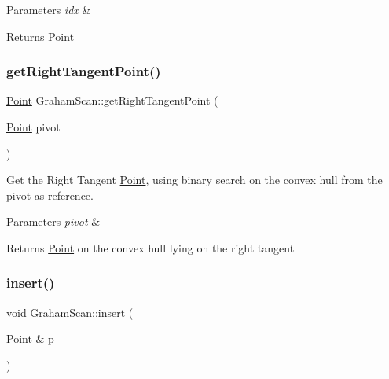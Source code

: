 \begin{DoxyParams}{Parameters}
{\em idx} & \\
\hline
\end{DoxyParams}
\begin{DoxyReturn}{Returns}
\mbox{\hyperlink{classPoint}{Point}} 
\end{DoxyReturn}
\mbox{\label{classGrahamScan_ae01e3fe104346f991f951a6843a15893}} 
\subsubsection{\texorpdfstring{get\+Right\+Tangent\+Point()}{getRightTangentPoint()}}
{\footnotesize\ttfamily \mbox{\hyperlink{classPoint}{Point}} Graham\+Scan\+::get\+Right\+Tangent\+Point (\begin{DoxyParamCaption}\item[{\mbox{\hyperlink{classPoint}{Point}}}]{pivot }\end{DoxyParamCaption})}



Get the Right Tangent \mbox{\hyperlink{classPoint}{Point}}, using binary search on the convex hull from the pivot as reference. 


\begin{DoxyParams}{Parameters}
{\em pivot} & \\
\hline
\end{DoxyParams}
\begin{DoxyReturn}{Returns}
\mbox{\hyperlink{classPoint}{Point}} on the convex hull lying on the right tangent 
\end{DoxyReturn}
\mbox{\label{classGrahamScan_a4996cb0d2deb3cd6f9cb3df99b91e7e8}} 
\subsubsection{\texorpdfstring{insert()}{insert()}}
{\footnotesize\ttfamily void Graham\+Scan\+::insert (\begin{DoxyParamCaption}\item[{\mbox{\hyperlink{classPoint}{Point}} \&}]{p }\end{DoxyParamCaption})\hspace{0.3cm}{\ttfamily [private]}}



